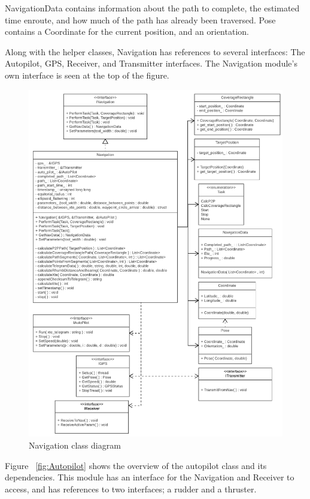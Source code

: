 NavigationData contains information about the path to complete, the estimated time enroute, and how much of the path has already been traversed. Pose contains a Coordinate for the current position, and an orientation. 

Along with the helper classes, Navigation has references to several interfaces: The Autopilot, GPS, Receiver, and Transmitter interfaces. The Navigation module's own interface is seen at the top of the figure.

\begin{figure}[H]
\centering
\includegraphics[width=1.2\linewidth]{Navigation_class_diagram}
\caption{Navigation class diagram}
\label{fig:Navigation}
\end{figure}

Figure ~\ref{fig:Autopilot} shows the overview of the autopilot class and its dependencies. This module has an interface for the Navigation and Receiver to access, and has references to two interfaces; a rudder and a thruster. 


